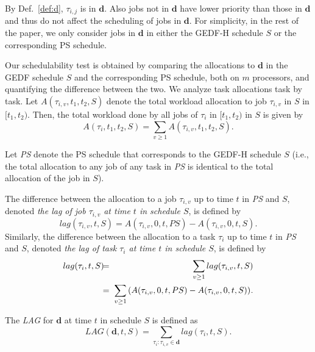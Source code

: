 \documentclass[Times, 10pt,twocolumn]{article}
\theoremstyle{definition}
\begin{document}
By Def.~\ref{def:d}, $\tau_{i,j}$ is in $\textbf{d}$. Also jobs not in $\textbf{d}$ have lower priority than those in $\textbf{d}$ and thus do not affect the scheduling of jobs in $\textbf{d}$. For simplicity, in the rest of the paper, we only consider jobs in $\textbf{d}$ in either the GEDF-H schedule $S$ or the corresponding PS schedule.

Our schedulability test is obtained by comparing the allocations to $\textbf{d}$ in the GEDF schedule $S$ and the corresponding PS schedule, both on $m$ processors, and quantifying the difference between the two. We analyze task allocations task by task. Let $A(\tau_{i,v}, t_1, t_2, S)$ denote the total workload allocation to job $\tau_{i,v}$ in $S$ in $[t_1, t_2)$. Then, the total workload done by all jobs of $\tau_i$ in $[t_1, t_2)$ in $S$ is given by \[ A(\tau_i, t_1, t_2, S)=\sum_{v \geq 1} A(\tau_{i,v}, t_1, t_2, S). \]



Let \textit{PS} denote the PS schedule that corresponds to the GEDF-H schedule $S$ (i.e., the total allocation to any job of any task in \textit{PS} is identical to the total allocation of the job in $S$). 

The difference between the allocation to a job $\tau_{i,v}$ up to time $t$ in \textit{PS} and $S$, denoted \textit{the lag of job $\tau_{i,v}$ at time $t$ in schedule $S$}, is defined by
\begin{equation*}
lag(\tau_{i,v}, t, S) = A(\tau_{i,v}, 0, t, PS) - A(\tau_{i,v}, 0, t, S).
\end{equation*}
Similarly, the difference between the allocation to a task $\tau_{i}$ up to time $t$ in  \textit{PS} and $S$, denoted \textit{the lag of task $\tau_{i}$ at time $t$ in schedule $S$}, is defined by\small
\begin{eqnarray}
\label{eq:lag for task}
lag(\tau_i, t, S) \hspace{-1.5mm} & = & \hspace{-2mm} \sum_{v \geq 1} lag(\tau_{i,v}, t, S) \nonumber \\
                \hspace{-1.5mm} & = & \hspace{-1.5mm} \sum_{v \geq 1} \left(A(\tau_{i,v}, 0, t, PS) - A(\tau_{i,v}, 0, t, S)\right)\hspace{-0.5mm}.
\end{eqnarray}
\normalsize

The \textit{LAG} for $\textbf{d}$ at time $t$ in schedule $S$ is defined as
\begin{equation}
\label{eq:LAG for task set}
LAG(\textbf{d}, t, S) = \sum_{\tau_i: \tau_{i,v} \in \textbf{d}} lag(\tau_i, t, S).
\end{equation}
\end{document}
